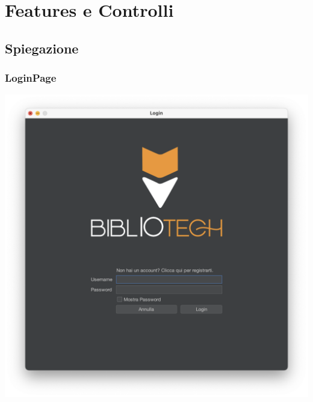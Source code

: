 \chapter{Features e Controlli}
\section{Spiegazione}


\subsection{LoginPage}
\includegraphics[scale=0.25]{Immagini/Schermate/Login_Register/LoginPage.png}


